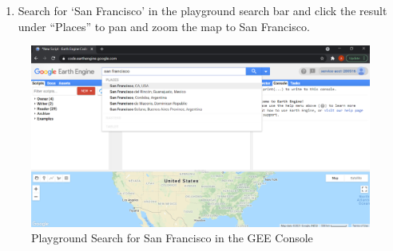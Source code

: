 \documentclass[
]{article}
\providecommand{\tightlist}{%
  \setlength{\itemsep}{0pt}\setlength{\parskip}{0pt}}
\begin{document}
\begin{enumerate}
\def\labelenumi{\alph{enumi}.}
\tightlist
\item
  Search for `San Francisco' in the playground search bar and click the result under ``Places'' to pan and zoom the map to San Francisco.
\end{enumerate}

\begin{figure}

{\centering \includegraphics[width=0.95\linewidth]{./im/im_03_01} 

}

\caption{Playground Search for San Francisco in the GEE Console}\label{fig:sfgeeexample}
\end{figure}
\end{document}
